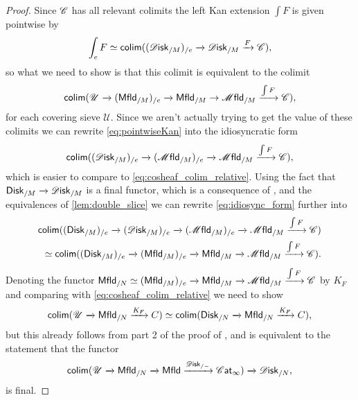 \documentclass[../text]{subfiles}
\begin{document}
\begin{proof}
    Since $\mathscr{C}$ has all relevant colimits the left Kan extension $\int F$ is given pointwise by
    \begin{equation}\label{eq:pointwiseKan}
        \int_e F \simeq \mathsf{colim} ((\disk_{/M})_{/e} \xrightarrow{} \disk_{/M} \xrightarrow{F} \catC),
    \end{equation}
    so what we need to show is that this colimit is equivalent to the colimit
    \begin{equation}\label{eq:cosheaf_colim_relative}
        \mathsf{colim} (\mathscr{U} \xrightarrow{} (\mfld[r]_{/M})_{/e} \xrightarrow{} \mfld[r]_{/M} \rightarrow \mfld_{/M} \xrightarrow{\int F} \catC),
    \end{equation}
    for each covering sieve $\mathscr{U}$. Since we aren't actually trying to get the value of these colimits we can rewrite \cref{eq:pointwiseKan} into the idiosyncratic form
    \begin{equation}\label{eq:idiosync_form}
        \mathsf{colim} ((\disk_{/M})_{/e} \xrightarrow{} (\mfld_{/M})_{/e} \xrightarrow{} \mfld_{/M} \xrightarrow{\int F} \catC),
    \end{equation}
    which is easier to compare to \cref{eq:cosheaf_colim_relative}. Using the fact that $\disk[r]_{/M} \xrightarrow{} \disk_{/M}$ is a final functor, which is a consequence of \cite[prop.2.22]{aft_fhstrat}, and the equivalences of \cref{lem:double_slice} we can rewrite \cref{eq:idiosync_form} further into
    \begin{align}
        \mathsf{colim} ((\disk[r]_{/M})_{/e} \xrightarrow{} (\disk_{/M})_{/e} \xrightarrow{} (\mfld_{/M})_{/e} \xrightarrow{} \mfld_{/M} \xrightarrow{\int F} \catC) \\ \simeq \mathsf{colim} ((\disk[r]_{/M})_{/e} \xrightarrow{} (\mfld[r]_{/M})_{/e} \xrightarrow{} \mfld[r]_{/M} \xrightarrow{} \mfld_{/M} \xrightarrow{\int F} \catC).
    \end{align}
    Denoting the functor $\mfld[r]_{/N} \simeq (\mfld[r]_{/M})_{/e} \xrightarrow{} \mfld[r]_{/M} \xrightarrow{} \mfld_{/M} \xrightarrow{\int F} \catC$ by $K_F$ and comparing with \cref{eq:cosheaf_colim_relative} we need to show
    \begin{equation}
        \mathsf{colim} (\mathscr{U} \xrightarrow{} \mfld[r]_{/N} \xrightarrow{K_F} C) \simeq \mathsf{colim} (\disk[r]_{/N} \xrightarrow{} \mfld[r]_{/N} \xrightarrow{K_F} C),
    \end{equation}
    but this already follows from part 2 of the proof of \cite[prop.2.22]{af_primer}, and is equivalent to the statement that the functor
    \begin{equation}
        \mathsf{colim} (\mathscr{U} \xrightarrow{} \mfld[r]_{/N} \xrightarrow{} \mfld[r] \xrightarrow{\disk_{/-}} \cat) \xrightarrow{} \disk_{/N},
    \end{equation}
    is final.
\end{proof}
\end{document}
